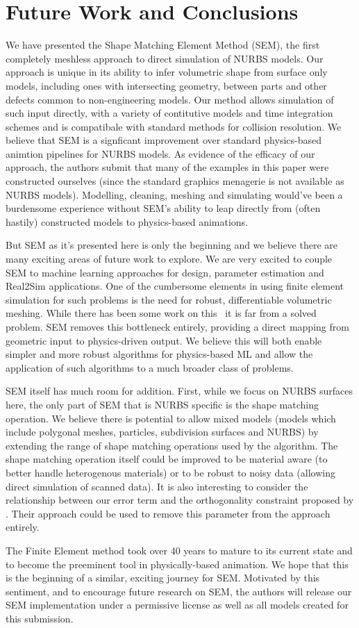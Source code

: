 \section{Future Work and Conclusions}
We have presented the Shape Matching Element Method (SEM), the first completely meshless approach to direct simulation of NURBS models.
Our approach is unique in its ability to infer volumetric shape from surface only models,
including ones with intersecting geometry, between parts and other defects common to non-engineering models.
Our method allows simulation of such input directly, with a variety of contitutive models and time integration schemes
and is compatibale with standard methods for collision resolution. 
We believe that SEM is a signficant improvement over standard physics-based animtion pipelines for NURBS models. 
As evidence of the efficacy of our approach, the authors submit that many of the examples in this paper were constructed ourselves
(since the standard graphics menagerie is not available as NURBS models). 
Modelling, cleaning, meshing and simulating would've been a burdensome experience without SEM's
ability to leap directly from (often hastily) constructed models to physics-based animations.

But SEM as it's presented here is only the beginning and we believe there are many exciting areas of future work to explore.
We are very excited to couple SEM to machine learning approaches for design, parameter estimation and Real2Sim applications.
One of the cumbersome elements in using finite element simulation for such problems is the need for robust, differentiable volumetric meshing.
While there has been some work on this~ it is far from a solved problem.
SEM removes this bottleneck entirely, providing a direct mapping from geometric input to physics-driven output. 
We believe this will both enable simpler and more robust algorithms for  physics-based ML and 
allow the application of such algorithms to a much broader class of problems. 

SEM itself has much room for addition.
First, while we focus on NURBS surfaces here, the only part of SEM that is NURBS specific is the shape matching operation.
We believe there is potential to allow mixed models (models which include polygonal meshes, particles, subdivision surfaces and NURBS)
by extending the range of shape matching operations used by the algorithm. The shape matching operation itself could be improved to be material aware 
(to better handle heterogenous materials) or to be robust to noisy data (allowing direct simulation of scanned data). 
It is also interesting to consider the relationship between our error term and the orthogonality constraint proposed by \citet{Zhang:CompDynamics:2020}. 
Their approach could be used to remove this parameter from the approach entirely.

The Finite Element method took over  40 years to mature to its current state and to become the preeminent tool in physically-based animation.
We hope that this is the beginning of a similar, exciting journey for SEM. 
Motivated by this sentiment, and to encourage future research on SEM, the authors will release our SEM implementation 
under a permissive license as well as all models created for this submission.

